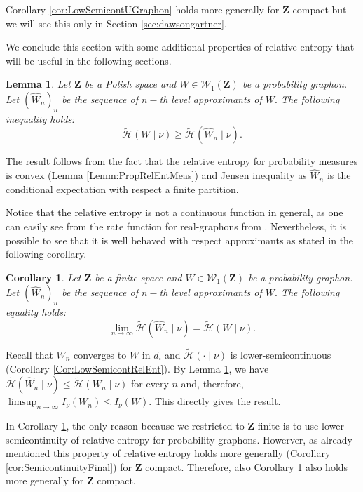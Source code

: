 \documentclass[12pt,twoside,a4paper]{article}
\newtheorem{corollary}{Corollary}[theorem]
\newtheorem{lemma}[theorem]{Lemma}
\newcommand{\Space}{\mathbf{Z}}
\newcommand{\Graphon}{\mathcal{W}_1}
\begin{document}
Corollary \ref{cor:LowSemicontUGraphon} holds more generally for $\Space$ compact but we will see this only in Section \ref{sec:dawsongartner}.

We conclude this section with some additional properties of relative entropy that will be useful in the following sections.

\begin{lemma}\label{lemm:EntropIneqDisc}
Let $\Space$ be a Polish space and $W\in \Graphon(\Space)$ be a probability graphon. Let $(\widehat{W}_n)_n$ be the sequence of $n-$th level approximants of $W.$  The following inequality holds:
\begin{equation*}
    \widetilde{\mathcal{H}}(W \mid \nu)\geq \widetilde{\mathcal{H}}(\widehat{W}_n \mid \nu).
\end{equation*}
\end{lemma}
\proof
The result follows from the fact that the relative entropy for probability measures is convex (Lemma \ref{Lemm:PropRelEntMeas}) and Jensen inequality as $\widehat{W}_n$ is the conditional expectation with respect a finite partition. 
\endproof

Notice that the relative entropy is not a continuous function in general, as one can easily see from the rate function for real-graphons from \cite{ChatterjeeVaradhan2011}. Nevertheless, it is possible to see that it is well behaved with respect approximants as stated in the following corollary.


\begin{corollary}\label{cor:ConvEntropyAproxim}
Let $\Space$ be a finite space and $W\in \Graphon(\Space)$ be a probability graphon. Let $(\widehat{W}_n)_n$ be the sequence of $n-$th level approximants of $W.$  The following equality holds:
\begin{equation*}
 \lim_{n\rightarrow\infty}\widetilde{\mathcal{H}}(\widehat{W}_n \mid \nu)=   \widetilde{\mathcal{H}}(W \mid \nu).
\end{equation*}
\end{corollary}
\proof
Recall that $W_n$ converges to $W$ in $d_{\square}$ and $\widetilde{\mathcal{H}}(\cdot \mid \nu)$ is lower-semicontinuous (Corollary \ref{Cor:LowSemicontRelEnt}). By Lemma \ref{lemm:EntropIneqDisc}, we have  $\widetilde{\mathcal{H}}(\widehat{W}_n \mid \nu)\leq \widetilde{\mathcal{H}}(W_n \mid \nu)$ for every $n$ and, therefore, $\limsup_{n\rightarrow \infty}I_\nu(W_n)\leq I_\nu(W).$ This directly gives the result.
\endproof

In Corollary \ref{cor:ConvEntropyAproxim}, the only reason because we restricted to $\Space$ finite is to use lower-semicontinuity of relative entropy for probability graphons. Howerver, as already mentioned this property of relative entropy holds more generally (Corollary \ref{cor:SemicontinuityFinal}) for $\Space$ compact. Therefore, also Corollary \ref{cor:ConvEntropyAproxim} also holds more generally for $\Space$ compact.
\end{document}
